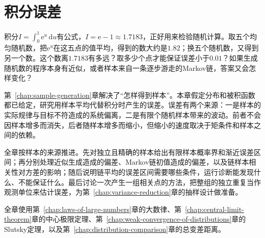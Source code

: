 \chapter{积分误差}
\label{chap:monte-carlo-integration-error}

积分$I=\int_0^1\mathrm{e}^{u}\,\mathrm{d}u$有公式，$I=\mathrm{e}-1\approx1.7183$，正好用来检验随机计算。取五个均匀随机数，把$\mathrm{e}^{u}$在这五点的值平均，得到的数大约是$1.82$；换五个随机数，又得到另一个数。这个数离$1.7183$有多远？取多少个点才能保证误差小于$0.01$？如果生成随机数的程序本身有近似，或者样本来自一条逐步游走的Markov链，答案又会怎样变化？

第~\ref{chap:sample-generation}章解决了“怎样得到样本”。本章假定分布和被积函数都已给定，研究用样本平均代替积分时产生的误差。误差有两个来源：一是样本的实际规律与目标不符造成的系统偏离，二是有限个随机样本带来的波动。前者不会因样本增多而消失，后者随样本增多而缩小，但缩小的速度取决于矩条件和样本之间的依赖。

全章按样本的来源推进。先对独立且精确的样本给出有限样本概率界和渐近误差区间；再分别处理近似生成造成的偏差、Markov链初值造成的偏差，以及链样本相关性对方差的影响；随后说明链平均的误差区间需要哪些条件，运行诊断能发现什么、不能保证什么。最后讨论一次产生一组相关点的方法，把整组的独立重复当作观测单位来估计误差，为第~\ref{chap:variance-reduction}章的抽样设计做准备。

全章使用第~\ref{chap:laws-of-large-numbers}章的大数律、第~\ref{chap:central-limit-theorem}章的中心极限定理、第~\ref{chap:weak-convergence-of-distributions}章的Slutsky定理，以及第~\ref{chap:distribution-comparison}章的总变差距离。
















